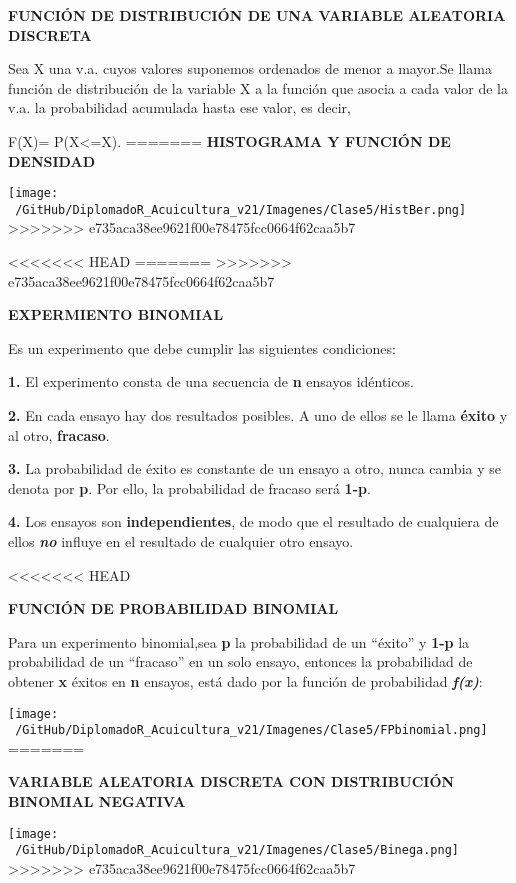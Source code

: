 \documentclass[ignorenonframetext,]{beamer}
\begin{document}
\begin{frame}{}
\protect\hypertarget{section-10}{}

\textbf{FUNCIÓN DE DISTRIBUCIÓN DE UNA VARIABLE ALEATORIA DISCRETA}

Sea X una v.a. cuyos valores suponemos ordenados de menor a mayor.Se
llama función de distribución de la variable X a la función que asocia a
cada valor de la v.a. la probabilidad acumulada hasta ese valor, es
decir,

F(X)= P(X\textless{}=X).
=======
\textbf{HISTOGRAMA Y FUNCIÓN DE DENSIDAD}

\texttt{[image: ~/GitHub/DiplomadoR\_Acuicultura\_v21/Imagenes/Clase5/HistBer.png]}
>>>>>>> e735aca38ee9621f00e78475fcc0664f62caa5b7

\end{frame}

\begin{frame}{}
<<<<<<< HEAD
\protect\hypertarget{section-11}{}
=======
\protect\hypertarget{section-9}{}
>>>>>>> e735aca38ee9621f00e78475fcc0664f62caa5b7

\textbf{EXPERMIENTO BINOMIAL}

Es un experimento que debe cumplir las siguientes condiciones:

\textbf{1.} El experimento consta de una secuencia de \textbf{n} ensayos
idénticos.

\textbf{2.} En cada ensayo hay dos resultados posibles. A uno de ellos
se le llama \textbf{éxito} y al otro, \textbf{fracaso}.

\textbf{3.} La probabilidad de éxito es constante de un ensayo a otro,
nunca cambia y se denota por \textbf{p}. Por ello, la probabilidad de
fracaso será \textbf{1-p}.

\textbf{4.} Los ensayos son \textbf{independientes}, de modo que el
resultado de cualquiera de ellos \textbf{\emph{no}} influye en el
resultado de cualquier otro ensayo.

\end{frame}

\begin{frame}{}
<<<<<<< HEAD
\protect\hypertarget{section-12}{}

\textbf{FUNCIÓN DE PROBABILIDAD BINOMIAL}

Para un experimento binomial,sea \textbf{p} la probabilidad de un
``éxito'' y \textbf{1-p} la probabilidad de un ``fracaso'' en un solo
ensayo, entonces la probabilidad de obtener \textbf{x} éxitos en
\textbf{n} ensayos, está dado por la función de probabilidad
\textbf{\emph{f(x)}}:

\texttt{[image: ~/GitHub/DiplomadoR\_Acuicultura\_v21/Imagenes/Clase5/FPbinomial.png]}
=======
\protect\hypertarget{section-10}{}

\textbf{VARIABLE ALEATORIA DISCRETA CON DISTRIBUCIÓN BINOMIAL NEGATIVA}

\texttt{[image: ~/GitHub/DiplomadoR\_Acuicultura\_v21/Imagenes/Clase5/Binega.png]}
>>>>>>> e735aca38ee9621f00e78475fcc0664f62caa5b7

\end{frame}
\end{document}

